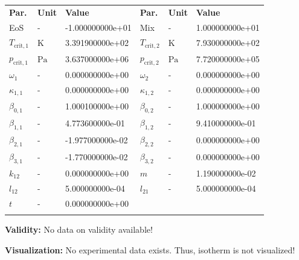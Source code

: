 \begin{longtable}[l]{lll|lll}
\toprule
\addlinespace
\textbf{Par.} & \textbf{Unit} & \textbf{Value} &	\textbf{Par.} & \textbf{Unit} & \textbf{Value} \\
\addlinespace
\midrule
\endhead

\bottomrule
\endfoot
\bottomrule
\endlastfoot
\addlinespace

EoS & - & -1.000000000e+01 & Mix & - & 1.000000000e+01 \\
$T_\mathrm{crit,1}$ & $\si{\kelvin}$ & 3.391900000e+02 & $T_\mathrm{crit,2}$ & $\si{\kelvin}$ & 7.930000000e+02 \\
$p_\mathrm{crit,1}$ & $\si{\pascal}$ & 3.637000000e+06 & $p_\mathrm{crit,2}$ & $\si{\pascal}$ & 7.720000000e+05 \\
$\omega_{1}$ & - & 0.000000000e+00 & $\omega_{2}$ & - & 0.000000000e+00 \\
$\kappa_{1,1}$ & - & 0.000000000e+00 & $\kappa_{1,2}$ & - & 0.000000000e+00 \\
$\beta_{0,1}$ & - & 1.000100000e+00 & $\beta_{0,2}$ & - & 1.000000000e+00 \\
$\beta_{1,1}$ & - & 4.773600000e-01 & $\beta_{1,2}$ & - & 9.410000000e-01 \\
$\beta_{2,1}$ & - & -1.977000000e-02 & $\beta_{2,2}$ & - & 0.000000000e+00 \\
$\beta_{3,1}$ & - & -1.770000000e-02 & $\beta_{3,2}$ & - & 0.000000000e+00 \\
$k_{12}$ & - & 0.000000000e+00 & $m$ & - & 1.190000000e-02 \\
$l_{12}$ & - & 5.000000000e-04 & $l_{21}$ & - & 5.000000000e-04 \\
$t$ & - & 0.000000000e+00 & & & \\

\addlinespace\end{longtable}

\textbf{Validity:}
\newline
No data on validity available!
\newline

\textbf{Visualization:}
%
\newline
No experimental data exists. Thus, isotherm is not visualized!
%

\FloatBarrier
\newpage
